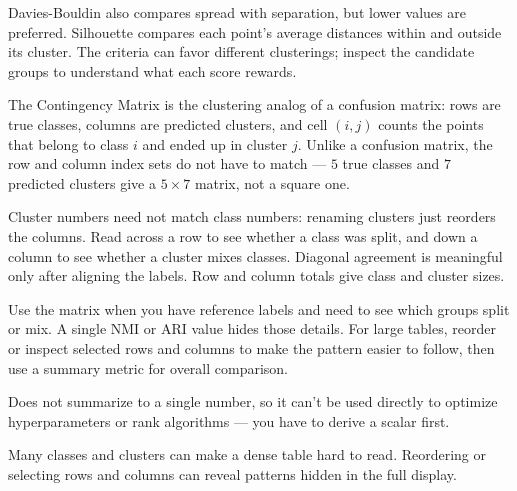 Davies-Bouldin also compares spread with separation, but lower values are preferred. Silhouette compares each point's average distances within and outside its cluster. The criteria can favor different clusterings; inspect the candidate groups to understand what each score rewards.

\metricend
\clearpage
\thispagestyle{clusteringstyle}
\label{sec:contingency-matrix}

The Contingency Matrix is the clustering analog of a confusion matrix: rows are true classes, columns are predicted clusters, and cell $(i, j)$ counts the points that belong to class $i$ and ended up in cluster $j$. Unlike a confusion matrix, the row and column index sets do not have to match --- $5$ true classes and $7$ predicted clusters give a $5 \times 7$ matrix, not a square one.

\begin{metricformula}
\end{metricformula}

Cluster numbers need not match class numbers: renaming clusters just reorders the columns. Read across a row to see whether a class was split, and down a column to see whether a cluster mixes classes. Diagonal agreement is meaningful only after aligning the labels. Row and column totals give class and cluster sizes.


Use the matrix when you have reference labels and need to see which groups split or mix. A single NMI or ARI value hides those details. For large tables, reorder or inspect selected rows and columns to make the pattern easier to follow, then use a summary metric for overall comparison.

{
    \item Does not summarize to a single number, so it can't be used directly to optimize hyperparameters or rank algorithms --- you have to derive a scalar first.
    \item Many classes and clusters can make a dense table hard to read. Reordering or selecting rows and columns can reveal patterns hidden in the full display.
}

